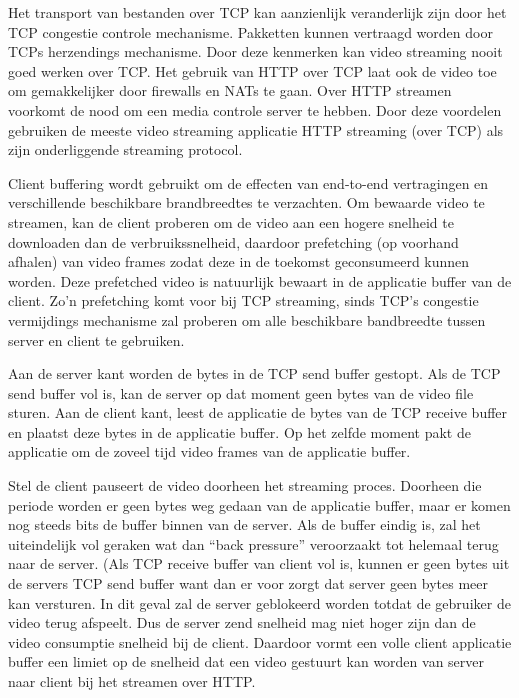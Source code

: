 Het transport van bestanden over TCP kan aanzienlijk veranderlijk zijn door het TCP congestie controle mechanisme. Pakketten kunnen vertraagd worden door TCPs herzendings mechanisme. Door deze kenmerken kan video streaming nooit goed werken over TCP.
Het gebruik van HTTP over TCP laat ook de video toe om gemakkelijker door firewalls en NATs te gaan. Over HTTP streamen voorkomt de nood om een media controle server te hebben. Door deze voordelen gebruiken de meeste video streaming applicatie HTTP streaming (over TCP) als zijn onderliggende streaming protocol.


Client buffering wordt gebruikt om de effecten van end-to-end vertragingen en verschillende beschikbare brandbreedtes te verzachten. Om bewaarde video te streamen, kan de client proberen om de video aan een hogere snelheid te downloaden dan de verbruikssnelheid, daardoor prefetching (op voorhand afhalen) van video frames zodat deze in de toekomst geconsumeerd kunnen worden. Deze prefetched video is natuurlijk bewaart in de applicatie buffer van de client. Zo’n prefetching komt voor bij TCP streaming, sinds TCP’s congestie vermijdings mechanisme zal proberen om alle beschikbare bandbreedte tussen server en client te gebruiken.

\clearpage


Aan de server kant worden de bytes in de TCP send buffer gestopt. Als de TCP send buffer vol is, kan de server op dat moment geen bytes van de video file sturen.
Aan de client kant, leest de applicatie de bytes van de TCP receive buffer en plaatst deze bytes in de applicatie buffer. Op het zelfde moment pakt de applicatie om de zoveel tijd video frames van de applicatie buffer.

Stel de client pauseert de video doorheen het streaming proces. Doorheen die periode worden er geen bytes weg gedaan van de applicatie buffer, maar er komen nog steeds bits de buffer binnen van de server. Als de buffer eindig is, zal het uiteindelijk vol geraken wat dan “back pressure” veroorzaakt tot helemaal terug naar de server. (Als TCP receive buffer van client vol is, kunnen er geen bytes uit de servers TCP send buffer want dan er voor zorgt dat server geen bytes meer kan versturen. In dit geval zal de server geblokeerd worden totdat de gebruiker de video terug afspeelt.
Dus de server zend snelheid mag niet hoger zijn dan de video consumptie snelheid bij de client. Daardoor vormt een volle client applicatie buffer een limiet op de snelheid dat een video gestuurt kan worden van server naar client bij het streamen over HTTP.

